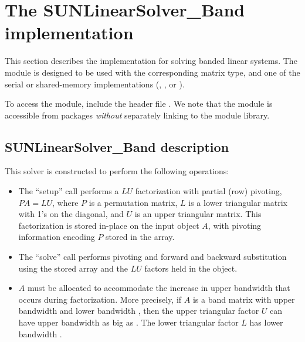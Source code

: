 \section{The SUNLinearSolver\_Band implementation}
\label{ss:sunlinsol_band}

This section describes the {\sunlinsol} implementation for solving banded linear
systems. The {\sunlinsolband} module is designed to be used with the
corresponding {\sunmatband} matrix type, and one of the serial or
shared-memory {\nvector} implementations ({\nvecs}, {\nvecopenmp}, or
{\nvecpthreads}).

To access the {\sunlinsolband} module, include the header file
. We note that the {\sunlinsolband} module is
accessible from {\sundials} packages \textit{without} separately linking to
the  module library.


\subsection{SUNLinearSolver\_Band description}
\label{ss:sunlinsol_band_description}

This solver is constructed to perform the following operations:
\begin{itemize}
\item The ``setup'' call performs a $LU$ factorization with
  partial (row) pivoting, $PA=LU$, where $P$ is a permutation matrix,
  $L$ is a lower triangular matrix with 1's on the diagonal, and $U$
  is an upper triangular matrix.  This factorization is stored
  in-place on the input {\sunmatband} object $A$, with pivoting
  information encoding $P$ stored in the  array.
\item The ``solve'' call performs pivoting and forward and
  backward substitution using the stored  array and the
  $LU$ factors held in the {\sunmatband} object.
\item
  $A$ must be allocated to accommodate the increase in upper
  bandwidth that occurs during factorization.  More precisely, if $A$
  is a band matrix with upper bandwidth  and lower bandwidth
  , then the upper triangular factor $U$ can have upper
  bandwidth as big as . The lower triangular
  factor $L$ has lower bandwidth . {\warn}
\end{itemize}



